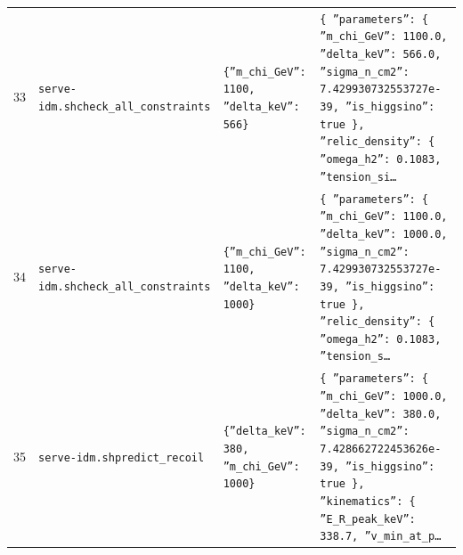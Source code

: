 \documentclass[11pt,a4paper]{article}
\begin{document}
\begin{longtable}{@{}p{}p{}p{}p{}@{}}
33 & \texttt{serve-idm.sh}\newline\texttt{check\_\allowbreak{}all\_\allowbreak{}constraints} & \texttt{\{''m\_\allowbreak{}chi\_\allowbreak{}GeV'':\allowbreak{} 1100,\allowbreak{} ''delta\_\allowbreak{}keV'':\allowbreak{} 566\}\allowbreak{}} & \texttt{\{   ''parameters'':\allowbreak{} \{     ''m\_\allowbreak{}chi\_\allowbreak{}GeV'':\allowbreak{} 1100.0,\allowbreak{}     ''delta\_\allowbreak{}keV'':\allowbreak{} 566.0,\allowbreak{}     ''sigma\_\allowbreak{}n\_\allowbreak{}cm2'':\allowbreak{} 7.429930732553727e-39,\allowbreak{}     ''is\_\allowbreak{}higgsino'':\allowbreak{} true   \}\allowbreak{},\allowbreak{}   ''relic\_\allowbreak{}density'':\allowbreak{} \{     ''omega\_\allowbreak{}h2'':\allowbreak{} 0.1083,\allowbreak{}     ''tension\_\allowbreak{}si\ldots{}\allowbreak{}} \\
34 & \texttt{serve-idm.sh}\newline\texttt{check\_\allowbreak{}all\_\allowbreak{}constraints} & \texttt{\{''m\_\allowbreak{}chi\_\allowbreak{}GeV'':\allowbreak{} 1100,\allowbreak{} ''delta\_\allowbreak{}keV'':\allowbreak{} 1000\}\allowbreak{}} & \texttt{\{   ''parameters'':\allowbreak{} \{     ''m\_\allowbreak{}chi\_\allowbreak{}GeV'':\allowbreak{} 1100.0,\allowbreak{}     ''delta\_\allowbreak{}keV'':\allowbreak{} 1000.0,\allowbreak{}     ''sigma\_\allowbreak{}n\_\allowbreak{}cm2'':\allowbreak{} 7.429930732553727e-39,\allowbreak{}     ''is\_\allowbreak{}higgsino'':\allowbreak{} true   \}\allowbreak{},\allowbreak{}   ''relic\_\allowbreak{}density'':\allowbreak{} \{     ''omega\_\allowbreak{}h2'':\allowbreak{} 0.1083,\allowbreak{}     ''tension\_\allowbreak{}s\ldots{}\allowbreak{}} \\
35 & \texttt{serve-idm.sh}\newline\texttt{predict\_\allowbreak{}recoil} & \texttt{\{''delta\_\allowbreak{}keV'':\allowbreak{} 380,\allowbreak{} ''m\_\allowbreak{}chi\_\allowbreak{}GeV'':\allowbreak{} 1000\}\allowbreak{}} & \texttt{\{   ''parameters'':\allowbreak{} \{     ''m\_\allowbreak{}chi\_\allowbreak{}GeV'':\allowbreak{} 1000.0,\allowbreak{}     ''delta\_\allowbreak{}keV'':\allowbreak{} 380.0,\allowbreak{}     ''sigma\_\allowbreak{}n\_\allowbreak{}cm2'':\allowbreak{} 7.428662722453626e-39,\allowbreak{}     ''is\_\allowbreak{}higgsino'':\allowbreak{} true   \}\allowbreak{},\allowbreak{}   ''kinematics'':\allowbreak{} \{     ''E\_\allowbreak{}R\_\allowbreak{}peak\_\allowbreak{}keV'':\allowbreak{} 338.7,\allowbreak{}     ''v\_\allowbreak{}min\_\allowbreak{}at\_\allowbreak{}p\ldots{}\allowbreak{}} \\

\end{longtable}
\end{document}
